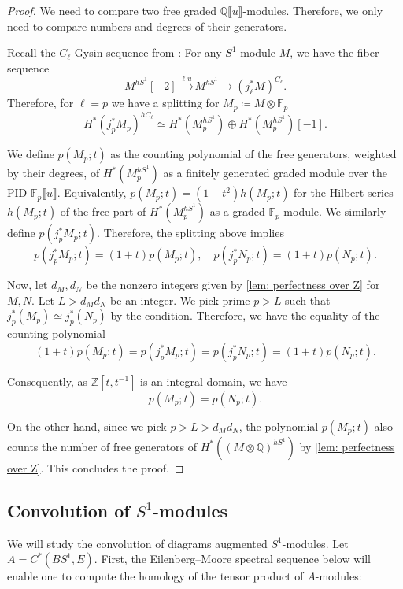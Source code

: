 \documentclass[11pt]{amsart}
\numberwithin{equation}{section}
\theoremstyle{plain}
\theoremstyle{definition}
\theoremstyle{remark}
\newcommand{\bF} { {\mathbb{F}}}
\newcommand{\bQ} { {\mathbb{Q}}}
\newcommand{\bZ} { {\mathbb{Z}}}
\newcommand{\fpw}[1]{{\llbracket #1\rrbracket}}
\begin{document}
\begin{proof}We need to compare two free graded $\bQ\fpw{u}$-modules. Therefore, we only need to compare numbers and degrees of their generators.

Recall the $C_\ell$-Gysin sequence from \cite[Proposition 2.25]{Li-Zhang26-1}: For any $S^1$-module $M$, we have the fiber sequence
\[M^{hS^1}[-2] \xrightarrow{\ell u} M^{hS^1}\to (j^*_\ell M)^{C_\ell}.\]
Therefore,  for $\ell=p$  we have a splitting for $M_p\coloneqq M\otimes\bF_p$
\[H^*(j^*_p M_p)^{hC_\ell}\simeq H^*(M_p^{hS^1})\oplus H^*(M_p^{hS^1})[-1].\]

We define $p(M_p;t )$ as the counting polynomial of the free generators, weighted by their degrees, of $H^*(M_p^{hS^1})$ as a finitely generated graded module over the PID $\bF_p\fpw{u}$. Equivalently, $p(M_p;t )=(1-t^2)h(M_p;t)$ for the Hilbert series  $h(M_p;t)$ of the free part of $H^*(M_p^{hS^1})$ as a graded $\bF_p$-module. We similarly define $p(j^*_pM_p;t )$.  
Therefore, the splitting above implies 
\[p(j^*_pM_p;t )=(1+t)p(M_p;t),\quad p(j^*_pN_p;t )=(1+t)p(N_p;t).\]


Now, let $d_M,d_N$ be the nonzero integers
given by \autoref{lem: perfectness over Z} for $M,N$. Let $L>d_Md_N$ be an integer. We pick prime $p>L$ such that $j^*_p(M_p)\simeq j^*_p(N_p)$ by the condition. Therefore, we have the equality of the counting polynomial
\[(1+t)p(M_p;t)=p(j^*_pM_p;t )=p(j^*_pN_p;t )=(1+t)p(N_p;t).\]

Consequently, as $\bZ[t,t^{-1}]$ is an integral domain, we have
\[ p(M_p;t) = p(N_p;t).\]

On the other hand, since we pick $p>L>d_Md_N$, the polynomial $p(M_p;t)$ also counts the number of free generators of $ H^*((M\otimes \bQ)^{hS^1}) $ by \autoref{lem: perfectness over Z}. This concludes the proof. 
\end{proof}




\subsection{\texorpdfstring{Convolution of $S^1$-modules}{}}
We will study the convolution of diagrams augmented $S^1$-modules. Let $A = C^*(BS^1, E)$. First, the Eilenberg--Moore spectral sequence below will enable one to compute the homology of the tensor product of $A$-modules:
\end{document}
